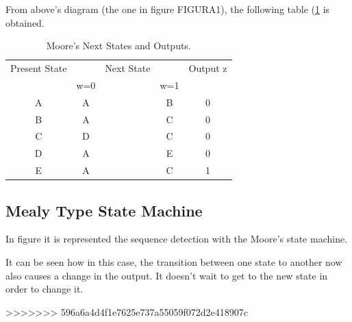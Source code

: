 From above's diagram (the one in figure FIGURA1), the following table (\ref {measej1} is obtained. 
\begin{table}[H]
\begin{center}
\begin{tabular}{|c|c c c|c|}
\hline
Present State & & Next State & & Output z \\
 & w=0 & & w=1 &   \\
\hline
\hline
A & A & & B & 0   \\
\hline
B & A & & C & 0   \\
\hline
C & D & & C & 0   \\
\hline
D & A & & E & 0   \\
\hline
E & A & & C & 1   \\
\hline
\hline
\end{tabular}
\end{center}
\caption{\label{measej1}\color{cyan}Moore's Next States and Outputs.}
\end{table}


\subsection{\color{purple}Mealy Type State Machine}

In figure %
it is represented the sequence detection with the Moore's state machine.

It can be seen how in this case, the transition between one state to another now also causes a change in the output. It doesn't wait to get to the new state in order to change it.

>>>>>>> 596a6a4d4f1e7625e737a55059f072d2e418907c
